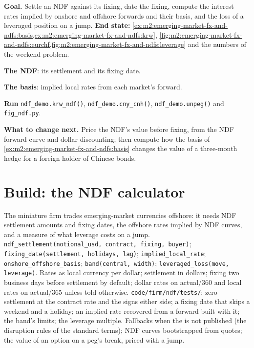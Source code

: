 \begin{tutorial}
\textbf{Goal.} Settle an NDF against its fixing, date the fixing, compute the
interest rates implied by onshore and offshore forwards and their basis, and the
loss of a leveraged position on a jump. \textbf{End state:}
\cref{ex:m2:emerging-market-fx-and-ndfs:basis,ex:m2:emerging-market-fx-and-ndfs:krw},
\cref{fig:m2:emerging-market-fx-and-ndfs:eurchf,fig:m2:emerging-market-fx-and-ndfs:leverage}
and the numbers of the weekend problem.
\begin{tutsteps}
\item \textbf{The NDF}: its settlement and its fixing date.
\label{lst:m2:emerging-market-fx-and-ndfs:ndf}
\item \textbf{The basis}: implied local rates from each market's forward.
\label{lst:m2:emerging-market-fx-and-ndfs:basis}
\item \textbf{Run} \texttt{ndf\_demo.krw\_ndf()}, \texttt{ndf\_demo.cny\_cnh()},
\texttt{ndf\_demo.unpeg()} and \texttt{fig\_ndf.py}.
\end{tutsteps}
\textbf{What to change next.} Price the NDF's value before fixing, from the NDF
forward curve and dollar discounting; then compute how the basis of
\cref{ex:m2:emerging-market-fx-and-ndfs:basis} changes the value of a three-month
hedge for a foreign holder of Chinese bonds.
\end{tutorial}

\section{Build: the NDF calculator}\label{bld:m2:emerging-market-fx-and-ndfs:ndf}

\begin{build}
 The miniature firm trades emerging-market currencies offshore:
it needs NDF settlement amounts and fixing dates, the offshore rates implied by
NDF curves, and a measure of what leverage costs on a jump.
 \texttt{ndf\_settlement(notional\_usd, contract, fixing,
buyer)}; \texttt{fixing\_date(settlement, holidays, lag)};
\texttt{implied\_local\_rate}; \texttt{onshore\_offshore\_basis};
\texttt{band(central, width)}; \texttt{leveraged\_loss(move, leverage)}.
 Rates as local currency per dollar; settlement in dollars;
fixing two business days before settlement by default; dollar rates on
actual/360 and local rates on actual/365 unless told otherwise.
 \texttt{code/firm/ndf/tests/}: zero settlement at the
contract rate and the signs either side; a fixing date that skips a weekend and a
holiday; an implied rate recovered from a forward built with it; the band's
limits; the leverage multiple.
 Fallbacks when the  is not published (the
disruption rules of the standard terms); NDF curves bootstrapped from quotes;
the value of an option on a peg's break, priced with a jump.
\end{build}


